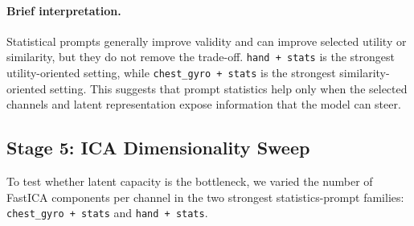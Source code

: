 \paragraph{Brief interpretation.}
Statistical prompts generally improve validity and can improve selected utility
or similarity, but they do not remove the trade-off. \texttt{hand + stats} is the
strongest utility-oriented setting, while \texttt{chest\_gyro + stats} is the
strongest similarity-oriented setting. This suggests that prompt statistics help
only when the selected channels and latent representation expose information
that the model can steer.

\subsection*{Stage 5: ICA Dimensionality Sweep}

To test whether latent capacity is the bottleneck, we varied the number of
FastICA components per channel in the two strongest statistics-prompt families:
\texttt{chest\_gyro + stats} and \texttt{hand + stats}.

\begin{table}[t]
\centering
\small
\caption{Condensed ICA sweep. The table keeps representative rows that should be
shown in the main report; the full sweep can be placed in an appendix.}
\label{tab:shanjun-ica}
\end{table}

